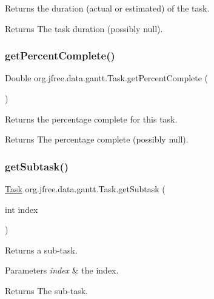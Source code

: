 Returns the duration (actual or estimated) of the task.

\begin{DoxyReturn}{Returns}
The task duration (possibly {\ttfamily null}). 
\end{DoxyReturn}
\mbox{\label{classorg_1_1jfree_1_1data_1_1gantt_1_1_task_abb694fbc64799ccd7130883dfd07314a}} 
\subsubsection{\texorpdfstring{get\+Percent\+Complete()}{getPercentComplete()}}
{\footnotesize\ttfamily Double org.\+jfree.\+data.\+gantt.\+Task.\+get\+Percent\+Complete (\begin{DoxyParamCaption}{ }\end{DoxyParamCaption})}

Returns the percentage complete for this task.

\begin{DoxyReturn}{Returns}
The percentage complete (possibly {\ttfamily null}). 
\end{DoxyReturn}
\mbox{\label{classorg_1_1jfree_1_1data_1_1gantt_1_1_task_a768f34d2fabe792c3a123e813ee4d16e}} 
\subsubsection{\texorpdfstring{get\+Subtask()}{getSubtask()}}
{\footnotesize\ttfamily \mbox{\hyperlink{classorg_1_1jfree_1_1data_1_1gantt_1_1_task}{Task}} org.\+jfree.\+data.\+gantt.\+Task.\+get\+Subtask (\begin{DoxyParamCaption}\item[{int}]{index }\end{DoxyParamCaption})}

Returns a sub-\/task.


\begin{DoxyParams}{Parameters}
{\em index} & the index.\\
\hline
\end{DoxyParams}
\begin{DoxyReturn}{Returns}
The sub-\/task. 
\end{DoxyReturn}
\mbox{\label{classorg_1_1jfree_1_1data_1_1gantt_1_1_task_ae9bd48c7e0e0220aae6aee29f1e73f60}} 
